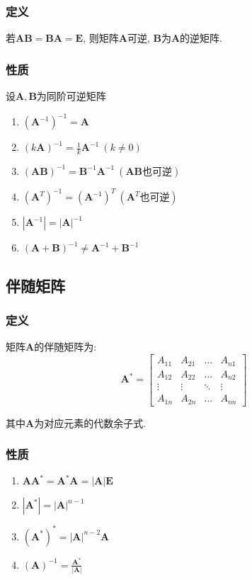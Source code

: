 \subsubsection{定义}
若$ \bm{A}\bm{B}=\bm{B}\bm{A}=\bm{E} $, 则矩阵$ \bm{A} $可逆, $ \bm{B} $为$ \bm{A} $的逆矩阵.
\subsubsection{性质}
设$ \bm{A}, \bm{B} $为同阶可逆矩阵
\begin{enumerate}
	\item $ (\bm{A}^{-1})^{-1}=\bm{A} $
	\item $ (k\bm{A})^{-1}=\frac{1}{k}\bm{A}^{-1}\ (k\neq 0) $
	\item $ (\bm{A}\bm{B})^{-1}=\bm{B}^{-1}\bm{A}^{-1}\ (\bm{A}\bm{B}\text{也可逆}) $
	\item $ (\bm{A}^{T})^{-1}=(\bm{A}^{-1})^{T}\ (\bm{A}^{T}\text{也可逆}) $
	\item $ |\bm{A}^{-1}|=|\bm{A}|^{-1} $
	\item $ (\bm{A}+\bm{B})^{-1}\neq \bm{A}^{-1}+\bm{B}^{-1} $
\end{enumerate}
\subsection{伴随矩阵}
\subsubsection{定义}
矩阵$ \bm{A} $的伴随矩阵为:
\begin{equation*}
	\bm{A}^{*}=
	\begin{bmatrix}
	A_{11}	& A_{21} & \dots & A_{n1} \\
	A_{12}	& A_{22} & \dots & A_{n2} \\
	\vdots	& \vdots & \ddots & \vdots \\
	A_{1n}	& A_{2n} & \dots & A_{nn}
	\end{bmatrix}
\end{equation*}\par
其中$ \bm{A} $为对应元素的代数余子式.
\subsubsection{性质}
\begin{enumerate}
	\item $ \bm{A}\bm{A}^{*}=\bm{A}^{*}\bm{A}=|\bm{A}|\bm{E} $
	\item $ |\bm{A}^{*}|=|\bm{A}|^{n-1} $
	\item $ (\bm{A}^{*})^{*}=|\bm{A}|^{n-2}\bm{A} $
	\item $ (\bm{A})^{-1}=\frac{\bm{A}^{*}}{|\bm{A}|} $
\end{enumerate}
